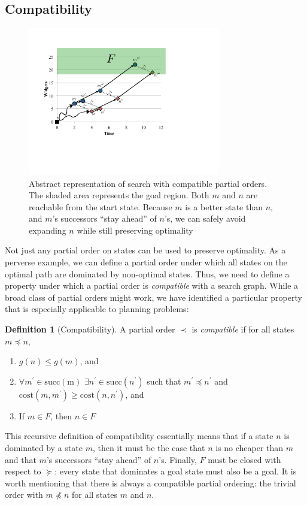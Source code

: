 \documentclass[letterpaper]{article}
\theoremstyle{plain} \newtheorem{theorem}{Theorem} \newtheorem{proposition}{Proposition} \newtheorem{lemma}{Lemma}
\theoremstyle{definition} \newtheorem{definition}{Definition} \newtheorem{conjecture}{Conjecture} \newtheorem*{example}{Example}
\theoremstyle{remark} \newtheorem*{remark}{Remark} \newtheorem*{note}{Note} \newtheorem{case}{Case}
\begin{document}
\subsection{Compatibility}
\begin{figure}
	\begin{center}
	\includegraphics[width=3.3in]{compatibility-2.pdf}
\end{center}
  \caption{Abstract representation of search with compatible partial
  orders. The shaded area represents the goal region. Both $m$ and $n$ are reachable from the start state.
  Because $m$ is a better state than $n$, and $m$'s successors
  ``stay ahead'' of $n$'s, we can safely avoid expanding $n$ while
  still preserving optimality}
  \label{fig:compatibility}
\end{figure}

Not just any partial order on states can be used to preserve optimality. As a perverse
example, we can define a partial order under which all states on the optimal path
are dominated by non-optimal states. Thus, we need to define a property
under which a partial order is \textit{compatible} with a search graph. While
a broad class of partial orders might work, we have identified a particular 
property that is especially applicable to planning problems:

\begin{definition}[Compatibility]
	\label{def-compatibility}
  A partial order $\prec$ is \textit{compatible} if for all states $m \preceq n$,
  \begin{enumerate}
    \item $g(n) \le g(m)$, and 
    \item $\forall m^\prime \in \mathrm{succ(m)}$ $\exists n^\prime \in
      \mathrm{succ}(n^\prime)$ such that $m^\prime \preceq n^\prime$ and
      $\mathrm{cost}(m,m^\prime) \ge \mathrm{cost}(n, n^\prime)$, and
    \item If $m \in F$, then $n \in F$
  \end{enumerate}
\end{definition}
This recursive definition of compatibility essentially means that
if a state $n$ is dominated by a state $m$, then it must be the
case that $n$ is no cheaper than $m$ and that $m$'s successors
``stay ahead'' of $n$'s. Finally, $F$ must be closed with respect
to $\succeq$: every state that dominates a goal state must also be
a goal. It is worth mentioning that there is always a compatible
partial ordering: the trivial order with $m \npreceq n$ for all
states $m$ and $n$.
\end{document}
